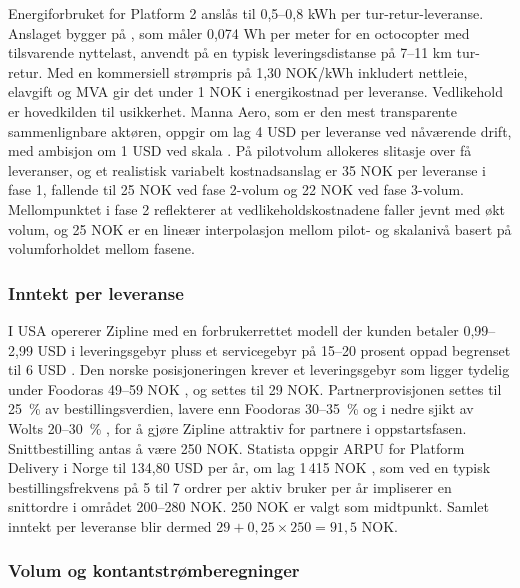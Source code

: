 Energiforbruket for Platform 2 anslås til 0{,}5--0{,}8 kWh per
tur-retur-leveranse. Anslaget bygger på \textcite{stolaroff2018}, som
måler 0{,}074 Wh per meter for en octocopter med tilsvarende nyttelast,
anvendt på en typisk leveringsdistanse på 7--11 km tur-retur. Med en
kommersiell strømpris på 1{,}30 NOK/kWh inkludert nettleie, elavgift og
MVA \parencite{ssb2026_strompris} gir det under 1 NOK i energikostnad
per leveranse. Vedlikehold er hovedkilden til usikkerhet.
Manna Aero, som er den mest transparente sammenlignbare aktøren, oppgir
om lag 4 USD per leveranse ved nåværende drift, med ambisjon om 1 USD
ved skala \parencite{sacra2025_manna}. På pilotvolum allokeres slitasje
over få leveranser, og et realistisk variabelt kostnadsanslag er
35 NOK per leveranse i fase 1, fallende til 25 NOK ved fase 2-volum og
22 NOK ved fase 3-volum. Mellompunktet i fase 2 reflekterer at
vedlikeholdskostnadene faller jevnt med økt volum, og 25 NOK er en
lineær interpolasjon mellom pilot- og skalanivå basert på
volumforholdet mellom fasene.

\subsubsection{Inntekt per leveranse}
\label{app:inntekt}

I USA opererer Zipline med en forbrukerrettet modell der kunden betaler
0{,}99--2{,}99 USD i leveringsgebyr pluss et servicegebyr på 15--20
prosent oppad begrenset til 6 USD \parencite{stevens2025}. Den norske
posisjoneringen krever et leveringsgebyr som ligger tydelig under
Foodoras 49--59 NOK \parencite{allrestaurantmenus2026}, og settes til
29 NOK. Partnerprovisjonen settes til 25~\% av bestillingsverdien,
lavere enn Foodoras 30--35~\% og i nedre sjikt av Wolts 20--30~\%
\parencite{nettavisen2024_foodora}, for å gjøre Zipline attraktiv for
partnere i oppstartsfasen. Snittbestilling antas å være 250 NOK. Statista oppgir ARPU for Platform
Delivery i Norge til 134{,}80 USD per år, om lag 1\,415 NOK
\parencite{statista2024_food_delivery_norway}, som ved en typisk
bestillingsfrekvens på 5 til 7 ordrer per aktiv bruker per år
impliserer en snittordre i området 200--280 NOK. 250 NOK er valgt som
midtpunkt. Samlet inntekt per
leveranse blir dermed $29 + 0{,}25 \times 250 = 91{,}5$ NOK.

\subsubsection{Volum og kontantstrømberegninger}
\label{app:volum}

